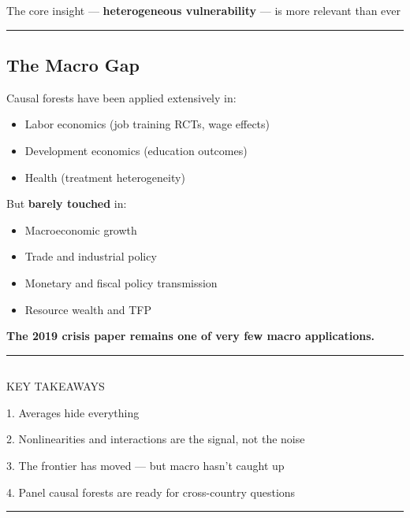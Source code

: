 \documentclass[
  letterpaper,
  DIV=11,
  numbers=noendperiod]{scrartcl}
\providecommand{\tightlist}{%
  \setlength{\itemsep}{0pt}\setlength{\parskip}{0pt}}
\begin{document}
{The core insight --- \textbf{heterogeneous vulnerability} --- is more
relevant than ever}

\begin{center}\rule{0.5\linewidth}{0.5pt}\end{center}

\subsection{The Macro Gap}\label{the-macro-gap}

Causal forests have been applied extensively in:

\begin{itemize}
\tightlist
\item
  Labor economics (job training RCTs, wage effects)
\item
  Development economics (education outcomes)
\item
  Health (treatment heterogeneity)
\end{itemize}

But \textbf{barely touched} in:

\begin{itemize}
\tightlist
\item
  Macroeconomic growth
\item
  Trade and industrial policy
\item
  Monetary and fiscal policy transmission
\item
  Resource wealth and TFP
\end{itemize}

{\textbf{The 2019 crisis paper remains one of very few macro
applications.}}

\begin{center}\rule{0.5\linewidth}{0.5pt}\end{center}

\subsection{}\label{section-4}

{KEY TAKEAWAYS}

{1.} {Averages hide everything}

{2.} {Nonlinearities and interactions are the signal, not the noise}

{3.} {The frontier has moved --- but macro hasn't caught up}

{4.} {Panel causal forests are ready for cross-country questions}

\begin{center}\rule{0.5\linewidth}{0.5pt}\end{center}
\end{document}
